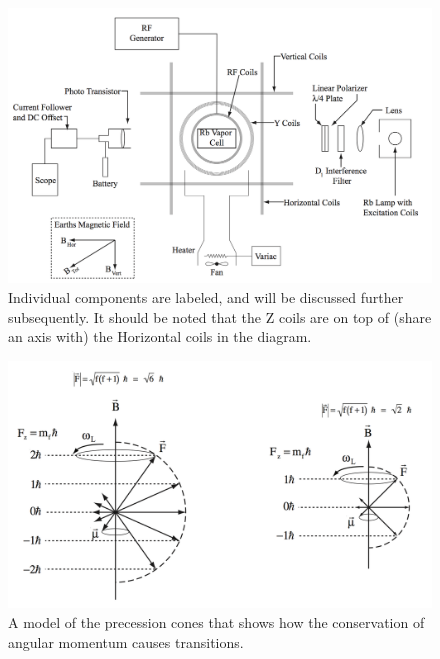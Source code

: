 \documentclass{article}
\begin{document}
  \begin{figure}[!htb]
    \centering
    \includegraphics[scale=.25]{apparatus.png}
    \caption{Individual components are labeled, and will be discussed further subsequently.  It should be noted that the Z coils are on top of (share an axis with) the Horizontal coils in the diagram.}
    \label{apparatus}
  \end{figure}

  \begin{figure}[!htb]
    \centering
    \includegraphics[scale=.25]{cones.png}
    \caption{A model of the precession cones that shows how the conservation of angular momentum causes transitions.}
    \label{cones}
  \end{figure}
\end{document}
